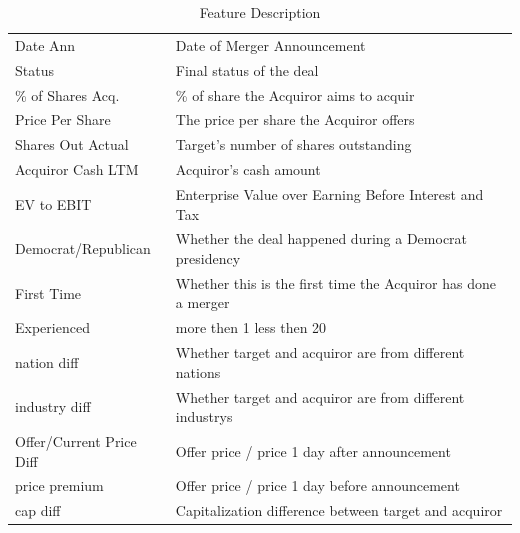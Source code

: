 \documentclass[a4paper]{article}
\begin{document}
\begin{table}[h]
\caption{Feature Description}
\begin{tabular}{ll}
Date Ann                 & Date of Merger Announcement                                  \\
Status                   & Final status of the deal                                     \\
\% of Shares Acq.        & \% of share the Acquiror aims to acquir                      \\
Price Per Share          & The price per share the Acquiror offers                      \\
Shares Out Actual        & Target's number of shares outstanding                        \\
Acquiror Cash LTM        & Acquiror's cash amount                                       \\
EV to EBIT               & Enterprise Value over Earning Before Interest and Tax        \\
Democrat/Republican      & Whether the deal happened during a Democrat presidency       \\
First Time               & Whether this is the first time the Acquiror has done a merger \\
Experienced              & more then 1 less then 20                            \\
nation diff              & Whether target and acquiror are from different nations       \\
industry diff            & Whether target and acquiror are from different industrys     \\
Offer/Current Price Diff & Offer price / price 1 day after announcement                 \\
price premium            & Offer price / price 1 day before announcement                \\
cap diff                & Capitalization difference between target and acquiror       
\end{tabular}
\end{table}
\end{document}

